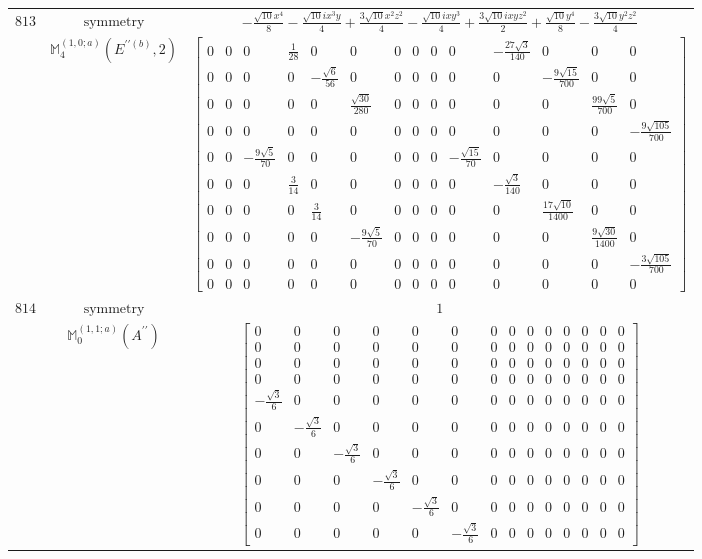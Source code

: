 \documentclass[fleqn,8pt,landscape]{jsarticle}
\begin{document}
\begin{longtable}{ccc}
$ 813 $ & $ \text{symmetry} $ & $ - \frac{\sqrt{10} x^{4}}{8} - \frac{\sqrt{10} i x^{3} y}{4} + \frac{3 \sqrt{10} x^{2} z^{2}}{4} - \frac{\sqrt{10} i x y^{3}}{4} + \frac{3 \sqrt{10} i x y z^{2}}{2} + \frac{\sqrt{10} y^{4}}{8} - \frac{3 \sqrt{10} y^{2} z^{2}}{4} $ \\
$  $ & $ \mathbb{M}_{4}^{(1,0;a)}(E^{\prime\prime(b)},2) $ & $ \begin{bmatrix} 0 & 0 & 0 & \frac{1}{28} & 0 & 0 & 0 & 0 & 0 & 0 & - \frac{27 \sqrt{3}}{140} & 0 & 0 & 0 \\ 0 & 0 & 0 & 0 & - \frac{\sqrt{6}}{56} & 0 & 0 & 0 & 0 & 0 & 0 & - \frac{9 \sqrt{15}}{700} & 0 & 0 \\ 0 & 0 & 0 & 0 & 0 & \frac{\sqrt{30}}{280} & 0 & 0 & 0 & 0 & 0 & 0 & \frac{99 \sqrt{5}}{700} & 0 \\ 0 & 0 & 0 & 0 & 0 & 0 & 0 & 0 & 0 & 0 & 0 & 0 & 0 & - \frac{9 \sqrt{105}}{700} \\ 0 & 0 & - \frac{9 \sqrt{5}}{70} & 0 & 0 & 0 & 0 & 0 & 0 & - \frac{\sqrt{15}}{70} & 0 & 0 & 0 & 0 \\ 0 & 0 & 0 & \frac{3}{14} & 0 & 0 & 0 & 0 & 0 & 0 & - \frac{\sqrt{3}}{140} & 0 & 0 & 0 \\ 0 & 0 & 0 & 0 & \frac{3}{14} & 0 & 0 & 0 & 0 & 0 & 0 & \frac{17 \sqrt{10}}{1400} & 0 & 0 \\ 0 & 0 & 0 & 0 & 0 & - \frac{9 \sqrt{5}}{70} & 0 & 0 & 0 & 0 & 0 & 0 & \frac{9 \sqrt{30}}{1400} & 0 \\ 0 & 0 & 0 & 0 & 0 & 0 & 0 & 0 & 0 & 0 & 0 & 0 & 0 & - \frac{3 \sqrt{105}}{700} \\ 0 & 0 & 0 & 0 & 0 & 0 & 0 & 0 & 0 & 0 & 0 & 0 & 0 & 0 \end{bmatrix} $ \\ \hline
$ 814 $ & $ \text{symmetry} $ & $ 1 $ \\
$  $ & $ \mathbb{M}_{0}^{(1,1;a)}(A^{\prime\prime}) $ & $ \begin{bmatrix} 0 & 0 & 0 & 0 & 0 & 0 & 0 & 0 & 0 & 0 & 0 & 0 & 0 & 0 \\ 0 & 0 & 0 & 0 & 0 & 0 & 0 & 0 & 0 & 0 & 0 & 0 & 0 & 0 \\ 0 & 0 & 0 & 0 & 0 & 0 & 0 & 0 & 0 & 0 & 0 & 0 & 0 & 0 \\ 0 & 0 & 0 & 0 & 0 & 0 & 0 & 0 & 0 & 0 & 0 & 0 & 0 & 0 \\ - \frac{\sqrt{3}}{6} & 0 & 0 & 0 & 0 & 0 & 0 & 0 & 0 & 0 & 0 & 0 & 0 & 0 \\ 0 & - \frac{\sqrt{3}}{6} & 0 & 0 & 0 & 0 & 0 & 0 & 0 & 0 & 0 & 0 & 0 & 0 \\ 0 & 0 & - \frac{\sqrt{3}}{6} & 0 & 0 & 0 & 0 & 0 & 0 & 0 & 0 & 0 & 0 & 0 \\ 0 & 0 & 0 & - \frac{\sqrt{3}}{6} & 0 & 0 & 0 & 0 & 0 & 0 & 0 & 0 & 0 & 0 \\ 0 & 0 & 0 & 0 & - \frac{\sqrt{3}}{6} & 0 & 0 & 0 & 0 & 0 & 0 & 0 & 0 & 0 \\ 0 & 0 & 0 & 0 & 0 & - \frac{\sqrt{3}}{6} & 0 & 0 & 0 & 0 & 0 & 0 & 0 & 0 \end{bmatrix} $ \\ \hline

\end{longtable}
\end{document}
